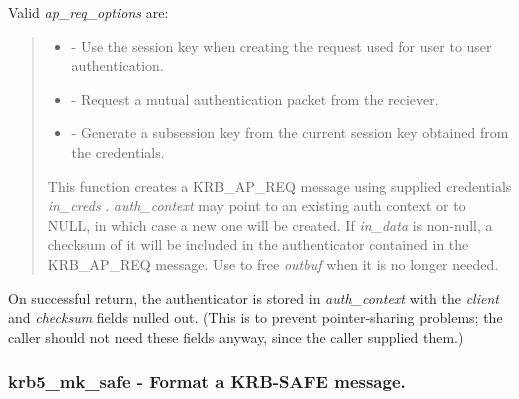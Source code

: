 \documentclass[letterpaper,10pt,english]{sphinxmanual}
\begin{document}
Valid \emph{ap\_req\_options} are:
\begin{quote}
\begin{itemize}
\item {} 
{\hyperref[appdev/refs/macros/AP_OPTS_USE_SESSION_KEY:AP_OPTS_USE_SESSION_KEY]{}} - Use the session key when creating the request used for user to user authentication.

\item {} 
{\hyperref[appdev/refs/macros/AP_OPTS_MUTUAL_REQUIRED:AP_OPTS_MUTUAL_REQUIRED]{}} - Request a mutual authentication packet from the reciever.

\item {} 
{\hyperref[appdev/refs/macros/AP_OPTS_USE_SUBKEY:AP_OPTS_USE_SUBKEY]{}} - Generate a subsession key from the current session key obtained from the credentials.

\end{itemize}

This function creates a KRB\_AP\_REQ message using supplied credentials \emph{in\_creds} . \emph{auth\_context} may point to an existing auth context or to NULL, in which case a new one will be created. If \emph{in\_data} is non-null, a checksum of it will be included in the authenticator contained in the KRB\_AP\_REQ message. Use {\hyperref[appdev/refs/api/krb5_free_data_contents:krb5_free_data_contents]{}} to free \emph{outbuf} when it is no longer needed.
\end{quote}

On successful return, the authenticator is stored in \emph{auth\_context} with the \emph{client} and \emph{checksum} fields nulled out. (This is to prevent pointer-sharing problems; the caller should not need these fields anyway, since the caller supplied them.)




{\hyperref[appdev/refs/api/krb5_mk_req:krb5_mk_req]{}}




\subsubsection{krb5\_mk\_safe -  Format a KRB-SAFE message.}
\label{appdev/refs/api/krb5_mk_safe:krb5-mk-safe-format-a-krb-safe-message}\label{appdev/refs/api/krb5_mk_safe::doc}
\end{document}
